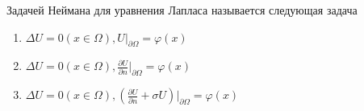 Задачей Неймана для уравнения Лапласа называется следующая задача

\begin{enumerate}[label=\arabic*)]
    \item \(\Delta U =0 ( x \in \Omega ), U\vert _{\partial \Omega }=\varphi (x)\)
    \item \(\Delta U =0 ( x \in \Omega ), \frac{\partial U}{\partial n}\vert _{\partial \Omega }=\varphi (x)\)
    \item \(\Delta U =0 ( x\in \Omega ), (\frac{\partial U}{\partial n}+\sigma U)\vert _{\partial \Omega }=\varphi (x)\)
\end{enumerate}

